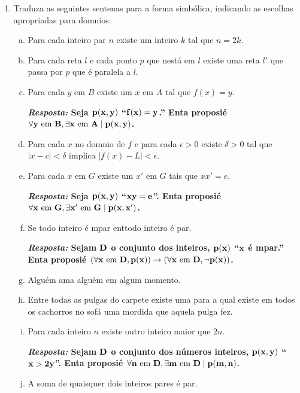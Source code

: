 \begin{enumerate}[{\bf 1.}]
\item Traduza as seguintes senten\cc as para a forma simb\'olica, indicando as escolhas apropriadas para dom\ih nios:
\begin{enumerate}[a)]
\item Para cada inteiro par $n$ existe um inteiro $k$ tal que $n=2k$.
\item Para cada reta $l$ e cada ponto $p$ que n\ao est\'a em $l$ existe uma reta $l'$ que passa por $p$ que \'e paralela a $l$.
\item Para cada $y$ em $B$ existe um $x$ em $A$ tal que $f(x)=y$.

{\bf{\it Resposta:} Seja ${\bf p(x,y)}$ ``${\bf f(x)=y}$.'' Ent\ao a proposi\cao \'e ${\bf \forall y \textrm{ em } B, \exists x \textrm{ em } A \mid  p(x,y)}$.}

\item Para cada $x$ no dom\ih nio de $f$ e para cada $\epsilon >0$ existe $\delta >0$ tal que $|x-c|<\delta$ implica $|f(x)-L|<\epsilon$.
\item Para cada $x$ em $G$ existe um $x'$ em $G$ tais que $xx'=e$.

{\bf{\it Resposta:}  Seja ${\bf p(x,y)}$ ``${\bf xy=e}$''. Ent\ao a proposi\cao \'e ${\bf \forall x \textrm{ em } G, \exists x' \textrm{ em } G  \mid  p(x,x')}$.}

\item Se todo inteiro \'e \ih mpar ent\ao todo inteiro \'e par. 

{\bf{\it Resposta:} Sejam ${\bf D}$ o conjunto dos inteiros, ${\bf p(x)}$ ``${\bf x}$ \'e \ih mpar.'' Ent\ao a proposi\cao \'e ${\bf(\forall x \textrm{ em } D, p(x))\to(\forall x \textrm{ em } D, \lnot p(x))}$.}

\item Algu\'em ama algu\'em em algum momento.
\item Entre todas as pulgas do carpete existe uma para a qual existe em todos os cachorros no sof\'a uma mordida que aquela pulga fez.
\item Para cada inteiro $n$ existe outro inteiro maior que $2n$.

{\bf{\it Resposta:}  Sejam ${\bf D}$ o conjunto dos n\'umeros inteiros, ${\bf p(x,y)}$ ``${\bf x>2y}$''. Ent\ao a proposi\cao \'e ${\bf \forall n \textrm{ em } D, \exists m \textrm{ em } D  \mid  p(m,n)}$.}

\item A soma de quaisquer dois inteiros pares \'e par.


\end{enumerate}
\end{enumerate}
